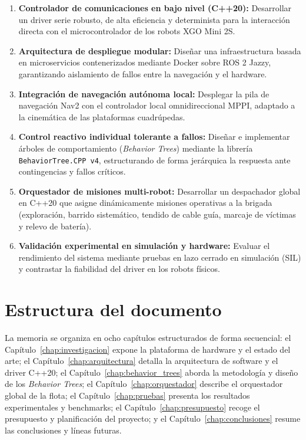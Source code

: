 \begin{enumerate}
    \item \textbf{Controlador de comunicaciones en bajo nivel (C++20):} Desarrollar un driver serie robusto, de alta eficiencia y determinista para la interacción directa con el microcontrolador de los robots XGO Mini 2S.
    \item \textbf{Arquitectura de despliegue modular:} Diseñar una infraestructura basada en microservicios contenerizados mediante Docker sobre ROS 2 Jazzy, garantizando aislamiento de fallos entre la navegación y el hardware.
    \item \textbf{Integración de navegación autónoma local:} Desplegar la pila de navegación Nav2 con el controlador local omnidireccional MPPI, adaptado a la cinemática de las plataformas cuadrúpedas.
    \item \textbf{Control reactivo individual tolerante a fallos:} Diseñar e implementar árboles de comportamiento (\textit{Behavior Trees}) mediante la librería \texttt{BehaviorTree.CPP v4}, estructurando de forma jerárquica la respuesta ante contingencias y fallos críticos.
    \item \textbf{Orquestador de misiones multi-robot:} Desarrollar un despachador global en C++20 que asigne dinámicamente misiones operativas a la brigada (exploración, barrido sistemático, tendido de cable guía, marcaje de víctimas y relevo de batería).
    \item \textbf{Validación experimental en simulación y hardware:} Evaluar el rendimiento del sistema mediante pruebas en lazo cerrado en simulación (SIL) y contrastar la fiabilidad del driver en los robots físicos.
\end{enumerate}

\section{Estructura del documento}
\label{sec:estructura}

La memoria se organiza en ocho capítulos estructurados de forma secuencial: el Capítulo~\ref{chap:investigacion} expone la plataforma de hardware y el estado del arte; el Capítulo~\ref{chap:arquitectura} detalla la arquitectura de software y el driver C++20; el Capítulo~\ref{chap:behavior_trees} aborda la metodología y diseño de los \textit{Behavior Trees}; el Capítulo~\ref{chap:orquestador} describe el orquestador global de la flota; el Capítulo~\ref{chap:pruebas} presenta los resultados experimentales y benchmarks; el Capítulo~\ref{chap:presupuesto} recoge el presupuesto y planificación del proyecto; y el Capítulo~\ref{chap:conclusiones} resume las conclusiones y líneas futuras.
